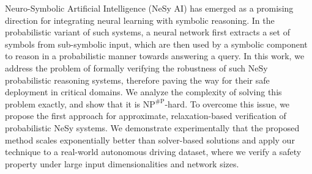 
Neuro-Symbolic Artificial Intelligence (NeSy AI) has emerged as a promising direction for integrating neural learning with symbolic reasoning. In the probabilistic variant of such systems, a neural network first extracts a set of symbols from sub-symbolic input, which are then used by a symbolic component to reason in a probabilistic manner towards answering a query. In this work, we address the problem of formally verifying the robustness of such NeSy probabilistic reasoning systems, therefore paving the way for their safe deployment in critical domains. We analyze the complexity of solving this problem exactly, and show that it is $\mathrm{NP}^{\# \mathrm{P}}$-hard. To overcome this issue, we propose the first approach for approximate, relaxation-based verification of probabilistic NeSy systems. We demonstrate experimentally that the proposed method scales exponentially better than solver-based solutions and apply our technique to a real-world autonomous driving dataset, where we verify a safety property under large input dimensionalities and network sizes.

